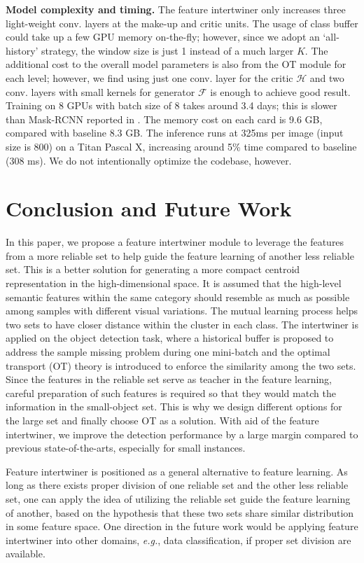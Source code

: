 \documentclass{article} \usepackage{iclr2019_conference,times}
\begin{document}
\textbf{Model complexity and timing.} The feature intertwiner only increases three light-weight conv. layers at the make-up and critic units. The usage of class buffer could take up a few GPU memory on-the-fly; however, since we adopt an `all-history' strategy, the window size is just 1 instead of a much larger $K$. 
The additional cost to the overall model parameters is also from the OT module for each level; however, we find using just one conv. layer for the critic $\mathcal{H}$ and two conv. layers with small kernels for generator $\mathcal{F}$ is enough to achieve good result. Training on 8 GPUs with batch size of 8 takes around 3.4 days; this is slower than Mask-RCNN reported in \citep{he2017_mask_rcnn}. The memory cost on each card is 9.6 GB, compared with baseline 8.3 GB. 
The inference runs at 325ms per image (input size is 800) on a Titan Pascal X, increasing around 5\% time compared to baseline (308 ms). We do {not} intentionally optimize the codebase, however. 


\section{Conclusion and Future Work}

In this paper, we propose a feature intertwiner module to 
leverage the features from a more reliable set to help guide the feature learning of another less reliable set. This is a better solution for generating a more compact centroid representation in the high-dimensional space. It is assumed that the high-level semantic features within the same category should resemble as much as possible among samples with different visual variations. The mutual learning process helps two sets to have closer distance within the cluster in each class. The intertwiner is applied on the object detection task, where a historical buffer is proposed to address the sample missing problem during one mini-batch and the optimal transport (OT) theory is introduced to enforce the similarity among the two sets. Since the features in the reliable set serve as teacher in the feature learning, careful preparation of such features is required so that they would match the information in the small-object set. This is why we design different options for the large set and finally choose OT as a solution.
With aid of the feature intertwiner, we improve the detection performance by a large margin compared to previous state-of-the-arts, especially for small instances. 

{
Feature intertwiner is positioned as a general alternative to feature learning.
As long as there exists proper division of one reliable set and the other less reliable set, one can apply the idea of utilizing the reliable set guide the feature learning of another, based on the hypothesis that these two sets share similar distribution in some feature space. One direction in the future work would be applying feature intertwiner into other domains, \textit{e.g.}, data classification, if proper set division are available.
}
\end{document}
